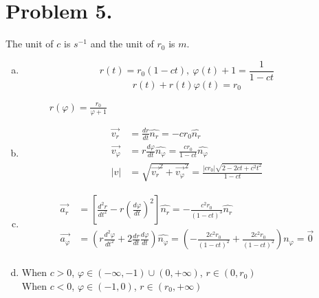 \documentclass{article}
\begin{document}
\section*{Problem 5.}
	The unit of $c$ is $s^{-1}$ and the unit of $r_0$ is $m$. 
	\begin{enumerate}[(a)]
	\item
		$$r(t)=r_0(1-ct),\ \varphi(t)+1=\frac{1}{1-ct}$$
		$$r(t)+r(t)\varphi(t)=r_0$$
	\newpage
		\begin{figure}[h!]
			\centering
			\caption{$r(\varphi)=\frac{r_0}{\varphi+1}$}
			\label{fig-sample}
		\end{figure}
	\item
		\begin{align*}
			\vec{v_r}&=\frac{dr}{dt}\hat{n_r}=-cr_0\hat{n_r}\\
			\vec{v_\varphi}&=r\frac{d\varphi}{dt}\hat{n_\varphi}=\frac{cr_0}{1-ct}\hat{n_\varphi}\\
			|v|&=\sqrt{\vec{v_r}^2+\vec{v_\varphi}^2}=\frac{|cr_0|\sqrt{2-2ct+c^2t^2}}{1-ct}
		\end{align*}
	\item
		\begin{align*}
			\vec{a_r}&=\left[\frac{d^2r}{dt^2}-r\left(\frac{d\varphi}{dt}\right)^2\right]\hat{n_r}=-\frac{c^2r_0}{(1-ct)^3}\hat{n_r}\\
			\vec{a_\varphi}&=\left(r\frac{d^2\varphi}{dt^2}+2\frac{dr}{dt}\frac{d\varphi}{dt}\right)\hat{n_\varphi}=\left(-\frac{2c^2r_0}{(1-ct)^2}+\frac{2c^2r_0}{(1-ct)^2}\right)\hat{n_\varphi}=\vec{0}\\
		\end{align*}
	\item
		When $c>0$, $\varphi\in(-\infty,-1)\cup(0,+\infty)$, $r\in(0,r_0)$\\
		When $c<0$, $\varphi\in(-1,0)$, $r\in(r_0,+\infty)$
	\end{enumerate}
	
\end{document}
